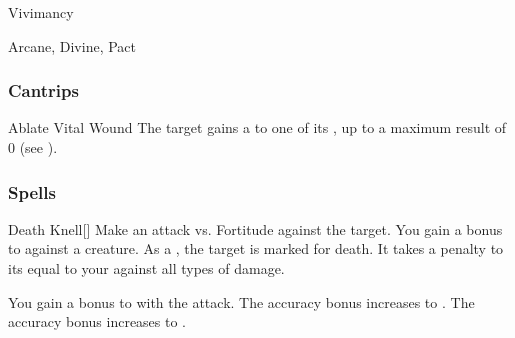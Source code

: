 \newpage
\begin{spellsection}{Vivimancy}

\begin{spellheader}
\end{spellheader}


 Arcane, Divine, Pact

\subsubsection{Cantrips}


\begin{freeability}{Ablate Vital Wound}
The target gains a   to one of its , up to a maximum result of 0 (see ).
\end{freeability}

\end{spellsection}


\subsubsection{Spells}


\lowercase{\hypertarget{spell:Death Knell}{}}\label{spell:Death Knell}
\begin{freeability}[Rank 1]{\hypertarget{spell:Death Knell}{Death Knell}}[]
Make an attack vs. Fortitude against the target.
You gain a  bonus to  against a  creature.
\hit As a , the target is marked for death.
It takes a penalty to its  equal to your  against all types of damage.

\rankline
{} You gain a  bonus to  with the attack.
 The accuracy bonus increases to .
 The accuracy bonus increases to .
\end{freeability}
\vspace{0.25em}



